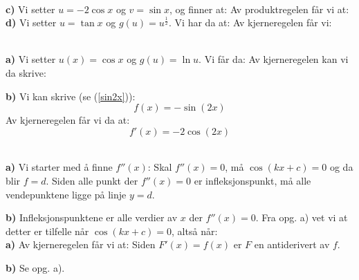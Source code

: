 

\usepackage{xr}



\\
\textbf{c)} Vi setter $ {u=-2\cos x} $ og $ v=\sin x $, og finner at:
Av produktregelen får vi at:
\textbf{d)} Vi setter $ u = \tan x $ og $ g(u)=u^\frac{1}{2} $. Vi har da at:
Av kjerneregelen får vi:

 \\
\textbf{a)} Vi setter $ u(x)=\cos x $ og $ g(u)=\ln u $. Vi får da:
Av kjerneregelen kan vi da skrive:

\textbf{b)} Vi kan skrive (se (\ref{sin2x})):
\[ f(x)= -\sin(2x)\]
Av kjerneregelen får vi da at:
\[ f'(x)=-2\cos(2x) \]

  \vsk

\\
\textbf{a)} Vi starter med å finne $ f''(x) $:
Skal $ f''(x)=0 $, må $ \cos(kx+c)=0 $ og da blir $ f=d $. Siden alle punkt der $ f''(x)=0 $ er infleksjonspunkt, må alle vendepunktene ligge på linje $ y=d $.

\textbf{b)} Infleksjonspunktene er alle verdier av $ x $ der $ f''(x)=0 $. Fra opg. a) vet vi at detter er tilfelle når $ \cos(kx+c )=0 $, altså når:
 \\
\textbf{a)} Av kjerneregelen får vi at: 
Siden $ F'(x)=f(x) $ er $ F $ en antiderivert av $ f $.

\textbf{b)} Se opg. a).

